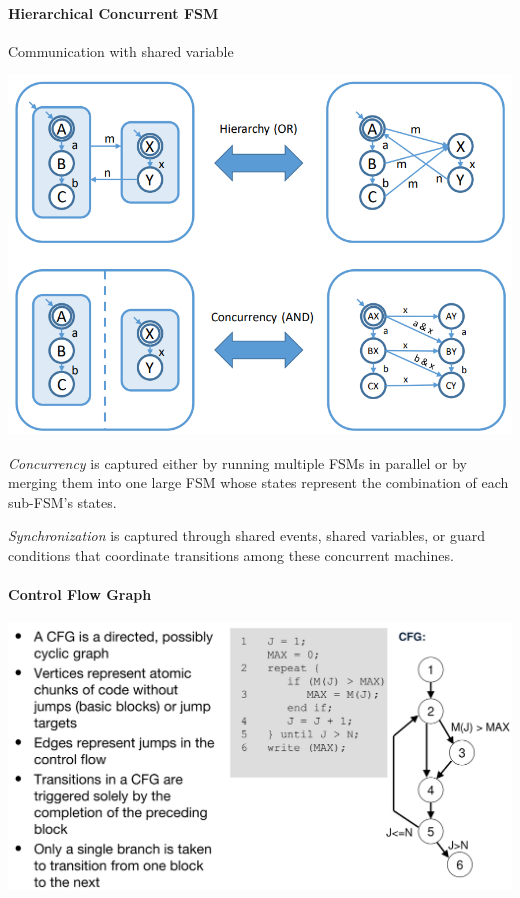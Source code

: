 \documentclass[english]{latex4ei/latex4ei_sheet}
\begin{document}
\paragraph{Hierarchical Concurrent FSM}
Communication with shared variable
\begin{center}
  \includegraphics[width=0.8\linewidth]{assets/FSMTut.png}
  \label{fig:fsmtut}
\end{center}

\textit{Concurrency} is captured either by running multiple FSMs in parallel or by merging them into one large FSM whose states represent the combination of each sub-FSM’s states.

\textit{Synchronization} is captured through shared events, shared variables, or guard conditions that coordinate transitions among these concurrent machines.

\paragraph{Control Flow Graph}

\begin{center}
  \includegraphics[width=0.8\linewidth]{assets/ControlFlowGraph.png}
  \label{fig:controlflowgraph}
\end{center}
\end{document}
